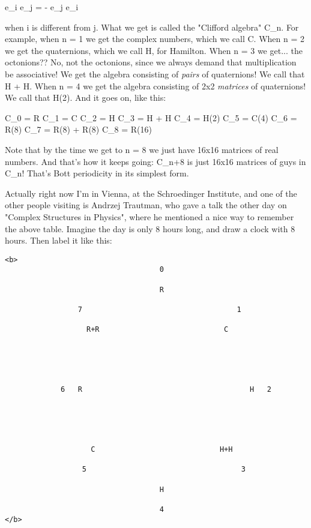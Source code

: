 e_{i} e_{j} = - e_{j} e_{i}

when i is different from j.  What we get is called the "Clifford
algebra" C_{n}.  For example, when n = 1 we get the complex numbers,
which we call C.  When n = 2 we get the quaternions, which we call H,
for Hamilton.  When n = 3 we get... the octonions??  No, not the
octonions, since we always demand that multiplication be associative!
We get the algebra consisting of \emph{pairs} of quaternions!  We call that
H + H.  When n = 4 we get the algebra consisting of 2x2 \emph{matrices} of
quaternions!  We call that H(2).  And it goes on, like this:

C_{0} = R
C_{1} =  C
C_{2} = H
C_{3} = H + H
C_{4} =  H(2)
C_{5} = C(4)
C_{6} = R(8)
C_{7} = R(8) + R(8)
C_{8} = R(16)

Note that by the time we get to n = 8 we just have 16x16 matrices of
real numbers.  And that's how it keeps going: C_{n+8} is just 16x16
matrices of guys in C_{n}!  That's Bott periodicity in its simplest form.

Actually right now I'm in Vienna, at the Schroedinger Institute, and
one of the other people visiting is Andrzej Trautman, who gave a talk
the other day on "Complex Structures in Physics", where he mentioned a
nice way to remember the above table.  Imagine the day is only 8 hours
long, and draw a clock with 8 hours.  Then label it like this:

                        

\begin{verbatim}
<b>
                                    0
                                 
                                    R

                 7                                    1
                                                   
                   R+R                             C





             6   R                                       H   2
 




                    C                             H+H
                 
                  5                                    3

                                    H

                                    4
</b>
\end{verbatim}
    


